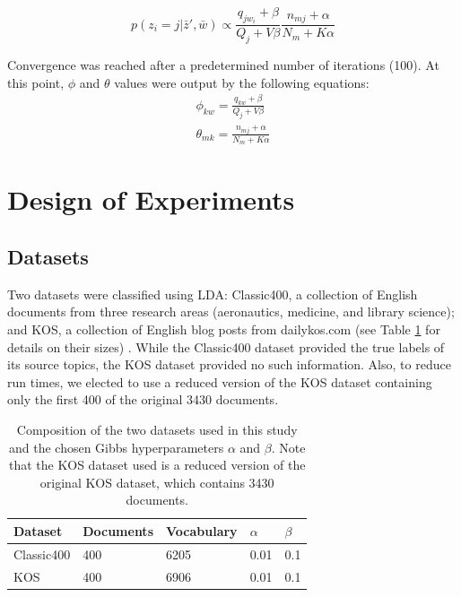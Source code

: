 \documentclass[10pt]{article}
\newcommand{\ra}[1]{\renewcommand{\arraystretch}{#1}}
\begin{document}
\begin{equation}
    p(z_i = j | \bar{z}', \bar{w}) \propto \frac{q_{j w_i} + \beta}{Q_j + V\beta} \frac{n_{mj} + \alpha}{N_m + K\alpha}
\end{equation}

Convergence was reached after a predetermined number of iterations (100). At this point, $\phi$ and $\theta$ values were output by the following equations:
\begin{eqnarray}
    \phi_{kw} = \frac{q_{kw} + \beta}{Q_j + V\beta}\\
    \theta_{mk} = \frac{n_{mj} + \alpha}{N_m + K\alpha} 
\end{eqnarray}



\section{Design of Experiments}
\label{sec:experiments}

%
%
\subsection{Datasets}
Two datasets were classified using LDA: Classic400, a collection of English documents from three research areas (aeronautics, medicine, and library science); and KOS, a collection of English blog posts from dailykos.com (see Table \ref{tab:datasets} for details on their sizes) \cite{Classic400, KOS_dataset}. While the Classic400 dataset provided the true labels of its source topics, the KOS dataset provided no such information. Also, to reduce run times, we elected to use a reduced version of the KOS dataset containing only the first 400 of the original 3430 documents.


\begin{table}[t]
    \centering
    \ra{1.2}
    \begin{tabular}{@{} l l l l l @{}}
        \toprule
        \bf{Dataset} & \bf{Documents} & \bf{Vocabulary} & $\alpha$ & $\beta$ \\
        \midrule
        Classic400 & 400 & 6205 & 0.01 & 0.1 \\
        KOS        & 400 & 6906 & 0.01 & 0.1\\
        \bottomrule
    \end{tabular}
    \caption{Composition of the two datasets used in this study and the chosen Gibbs hyperparameters $\alpha$ and $\beta$. Note that the KOS dataset used is a reduced version of the original KOS dataset, which contains 3430 documents.}
    \label{tab:datasets}
\end{table}
\end{document}
